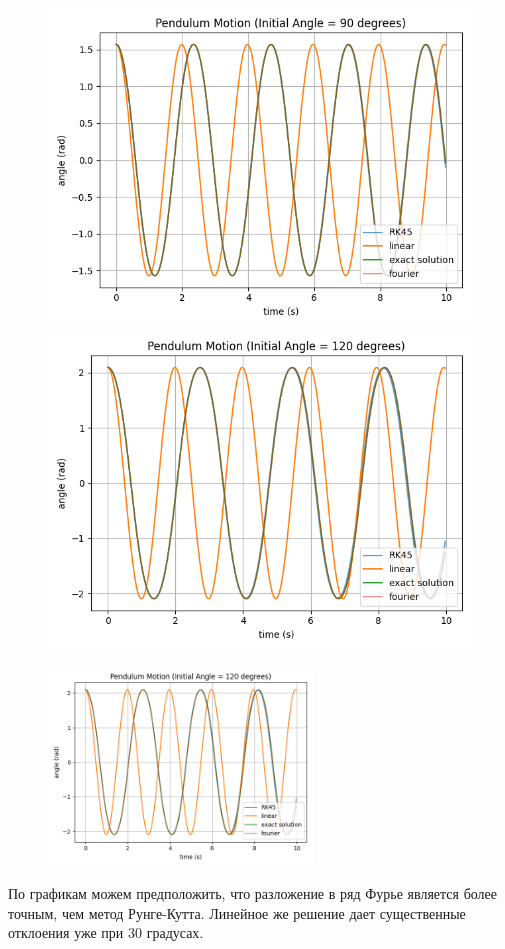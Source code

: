 \documentclass[a4paper,12pt]{article}
\begin{document}
\begin{figure}[!htb]
  \includegraphics[width=\linewidth]{90.png}\label{90}
\endminipage\hfill
{}
  \includegraphics[width=\linewidth]{120.png}\label{120}
\endminipage\hfill
\end{figure}

\begin{figure}[!htb]
    \centering
    \includegraphics[width=70mm]{120.png}
\end{figure}
По графикам можем предположить, что разложение в ряд Фурье является более точным, чем метод Рунге-Кутта. Линейное же решение дает существенные отклоения уже при 30 градусах.
\end{document}

